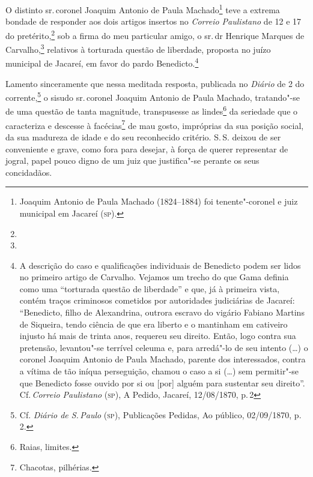 O distinto sr.\,coronel Joaquim Antonio de Paula Machado\footnote{
  Joaquim Antonio de Paula Machado (1824--1884) foi tenente"-coronel e
  juiz municipal em Jacareí (\textsc{sp}).} teve a extrema bondade de responder
aos dois artigos insertos no \emph{Correio Paulistano} de 12 e 17 do
pretérito,\footnote{} sob a firma do meu
particular amigo, o sr.\,dr Henrique Marques de Carvalho,\footnote{} relativos à torturada questão de liberdade, proposta no
juízo municipal de Jacareí, em favor do pardo Benedicto.\footnote{A
  descrição do caso e qualificações individuais de Benedicto podem ser
  lidos no primeiro artigo de Carvalho. Vejamos um trecho do que Gama
  definia como uma ``torturada questão de liberdade'' e que, já à primeira
  vista, contém traços criminosos cometidos por autoridades judiciárias
  de Jacareí: ``Benedicto, filho de Alexandrina, outrora escravo do
  vigário Fabiano Martins de Siqueira, tendo ciência de que era liberto
  e o mantinham em cativeiro injusto há mais de trinta anos, requereu
  seu direito. Então, logo contra sua pretensão, levantou"-se terrível
  celeuma e, para arredá"-lo de seu intento (\ldots{}) o coronel Joaquim
  Antonio de Paula Machado, parente dos interessados, contra a vítima de
  tão iníqua perseguição, chamou o caso a si (\ldots{}) sem permitir"-se que
  Benedicto fosse ouvido por si ou {[}por{]} alguém para sustentar seu
  direito''. Cf.\,\emph{Correio Paulistano} (\textsc{sp}), A Pedido, Jacareí,
  12/08/1870, p.\,2}

Lamento sinceramente que nessa meditada resposta, publicada no
\emph{Diário} de 2 do corrente,\footnote{Cf. \emph{Diário de S.\,Paulo}
  (\textsc{sp}), Publicações Pedidas, Ao público, 02/09/1870, p. 2.} o sisudo sr.\,coronel Joaquim Antonio de Paula Machado, tratando"-se de uma questão de
tanta magnitude, transpusesse as lindes\footnote{Raias, limites.} da
seriedade que o caracteriza e descesse à facécias\footnote{Chacotas,
  pilhérias.} de mau gosto, impróprias da sua posição social, da sua
madureza de idade e do seu reconhecido critério. S.\,S. deixou de ser
conveniente e grave, como fora para desejar, à força de querer
representar de jogral, papel pouco digno de um juiz que justifica"-se
perante os seus concidadãos.

